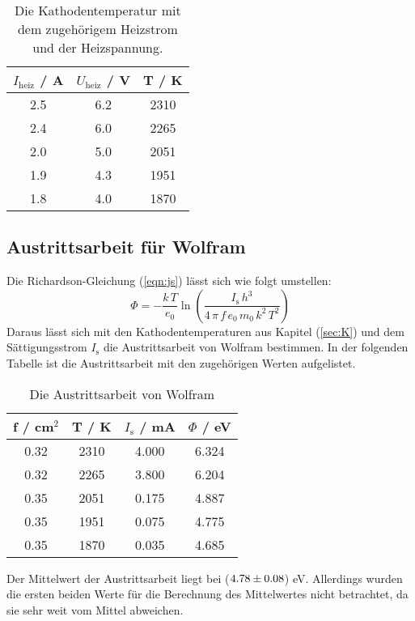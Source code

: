 \begin{table}[H]
  \centering
  \begin{tabular}{c c c}
    \toprule
    $I_\text{heiz}$ / A & $U_\text{heiz}$ / V & T / K \\
    \midrule
    2.5 & 6.2 & 2310 \\
    2.4 & 6.0 & 2265 \\
    2.0 & 5.0 & 2051 \\
    1.9 & 4.3 & 1951 \\
    1.8 & 4.0 & 1870 \\
    \bottomrule
  \end{tabular}
  \caption{Die Kathodentemperatur mit dem zugehörigem Heizstrom und der Heizspannung.}
  \label{tab:heiz}
\end{table}

\subsection{Austrittsarbeit für Wolfram}
\label{sec:AfW}
Die Richardson-Gleichung (\ref{eqn:js}) lässt sich wie folgt umstellen:
\begin{equation}
  \Phi = - \frac{k\, T}{e_0} \ln \left(\frac{I_\text{s}\, h^3}{4\, \pi\, f\, e_0\, m_0\, k^2\, T^2}\right)
\end{equation}
Daraus lässt sich mit den Kathodentemperaturen aus Kapitel (\ref{sec:K}) und dem Sättigungsstrom $I_\text{s}$ die Austrittsarbeit von Wolfram bestimmen. In der folgenden Tabelle ist die Austrittsarbeit mit den zugehörigen Werten aufgelistet.

\begin{table}[H]
  \centering
  \begin{tabular}{c c c c}
    \toprule
    f / cm$^2$ & T / K & $I_\text{s}$ / mA & $\Phi$ / eV \\
    \midrule
    0.32 & 2310 & 4.000 & 6.324 \\
    0.32 & 2265 & 3.800 & 6.204 \\
    0.35 & 2051 & 0.175 & 4.887 \\
    0.35 & 1951 & 0.075 & 4.775 \\
    0.35 & 1870 & 0.035 & 4.685 \\
    \bottomrule
  \end{tabular}
  \caption{Die Austrittsarbeit von Wolfram}
  \label{tab:}
\end{table}

Der Mittelwert der Austrittsarbeit liegt bei ($\num{4.78 +- 0.08}$) eV. Allerdings wurden die ersten beiden Werte für die Berechnung des Mittelwertes nicht betrachtet, da sie sehr weit vom Mittel abweichen.
